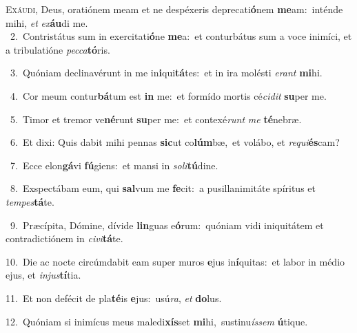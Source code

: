 \lettrine{\initial\textcolor{\initialcolor}{E}}{xáudi,} Deus, oratiónem meam et ne despéxeris deprecati\-\textbf{ó}\-nem \textbf{me}\-am:~\star inténde mihi, \textit{et} \textit{ex}\-\textbf{áu}di me.\\
{\numbfont\textcolor{\numbcolor}{~2.}}~Contristátus sum in exercitati\-\textbf{ó}\-ne \textbf{me}\-a:~\star et conturbátus sum a voce inimíci, et a tribulatióne \textit{pec}\-\textit{ca}\textbf{tó}ris.\par
{\numbfont\textcolor{\numbcolor}{~3.}}~Quóniam declinavérunt in me in\-\textbf{i}\-qui\-\textbf{tá}\-tes:~\star et in ira molésti \textit{e}\-\textit{rant} \textbf{mi}\-hi.\par
{\numbfont\textcolor{\numbcolor}{~4.}}~Cor meum contur\-\textbf{bá}\-tum est \textbf{in} me:~\star et formído mortis cé\-\textit{ci}\-\textit{dit} \textbf{su}\-per me.\par
{\numbfont\textcolor{\numbcolor}{~5.}}~Timor et tremor ve\-\textbf{né}\-runt \textbf{su}\-per me:~\star et contexé\textit{runt} \textit{me} \textbf{té}\-nebræ.\par
{\numbfont\textcolor{\numbcolor}{~6.}}~Et dixi: Quis dabit mihi pennas \textbf{sic}\-ut co\-\textbf{lúm}\-bæ,~\star et volábo, et \textit{re}\-\textit{qui}\textbf{és}cam?\par
{\numbfont\textcolor{\numbcolor}{~7.}}~Ecce elon\-\textbf{gá}\-vi \textbf{fú}\-giens:~\star et mansi in \textit{so}\-\textit{li}\textbf{tú}dine.\par
{\numbfont\textcolor{\numbcolor}{~8.}}~Exspectábam eum, qui \textbf{sal}\-vum me \textbf{fe}\-cit:~\star a pusillanimitáte spíritus et \textit{tem}\-\textit{pes}\textbf{tá}te.\par
{\numbfont\textcolor{\numbcolor}{~9.}}~Præcípita, Dómine, dívide \textbf{lin}\-guas e\-\textbf{ó}\-rum:~\star quóniam vidi iniquitátem et contradictiónem in \textit{ci}\-\textit{vi}\textbf{tá}te.\par
{\numbfont\textcolor{\numbcolor}{10.}}~Die ac nocte circúmdabit eam super muros \textbf{e}\-jus in\-\textbf{í}\-quitas:~\star et labor in médio ejus, et \textit{in}\-\textit{jus}\textbf{tí}tia.\par
{\numbfont\textcolor{\numbcolor}{11.}}~Et non defécit de pla\-\textbf{té}\-is \textbf{e}\-jus:~\star usú\-\textit{ra}\-, \textit{et} \textbf{do}\-lus.\par
{\numbfont\textcolor{\numbcolor}{12.}}~Quóniam si inimícus meus maledi\-\textbf{xís}\-set \textbf{mi}\-hi,~\star sustinu\-\textit{ís}\-\textit{sem} \textbf{ú}\-tique.\par
